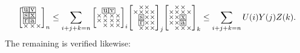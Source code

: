\documentclass[a4paper,12pt]{article}
\makeatletter
\newcommand{\mybox}[1]{%
  \begingroup
  \setlength{\fboxsep}{1pt}%
  \fbox{\small #1}%
  \endgroup
}
\newenvironment{grid}
  {\begingroup\footnotesize
   \renewcommand{\arraystretch}{0}
   \setlength{\arraycolsep}{0pt}
   \left[\begin{array}{@{}*{10}{c}@{}}}
  {\end{array}\right]\endgroup}
\newcommand{\void}{\phantom{\times}}
\makeatother
\begin{document}
    \[
    \begin{grid}
			\mybox{u} & \mybox{v} & \void \\
			\mybox{s} & \mybox{x} & \void \\
			\mybox{r} & \mybox{a} & \void \\
			\times & \times & \times
    \end{grid}_n \le \sum_{i+j+k=n} \begin{grid}
			\void & \mybox{u} & \mybox{v} & \void \\
			\times & \times & \times & \times \\
			\times & \times & \times & \times \\
			\void & \times & \times & \times
    \end{grid}_i     \begin{grid}
			\void & \times & \times & \void \\
			\times & \times & \times & \times \\
			\void & \mybox{s} & \times & \times \\
			\void & \mybox{r} & \times & \times \\
			\void & \times & \times & \times
    \end{grid}_j     \begin{grid}
            \void & \times & \times & \void \\
			\times & \times & \times & \times \\
			\times & \times & \mybox{x} & \void \\
			\times & \times & \mybox{a} & \void \\
			\void & \times & \times & \times
    \end{grid}_k \le \sum_{i+j+k=n} U(i)Y(j)Z(k).
    \]
    The remaining is verified likewise:
\end{document}
